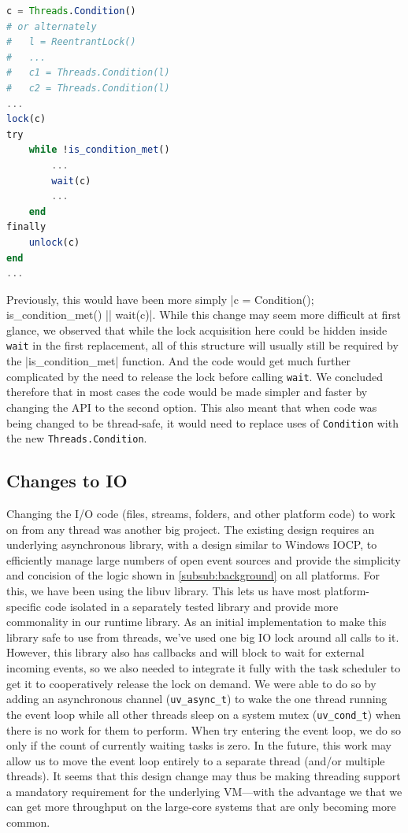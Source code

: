 \documentclass{juliacon}
\begin{document}
\begin{lstlisting}[language = Julia]
c = Threads.Condition()
# or alternately
#   l = ReentrantLock()
#   ...
#   c1 = Threads.Condition(l)
#   c2 = Threads.Condition(l)
...
lock(c)
try
    while !is_condition_met()
        ...
        wait(c)
        ...
    end
finally
    unlock(c)
end
...
\end{lstlisting}

Previously, this would have been more simply |c = Condition(); is_condition_met() || wait(c)|.  While this change may seem more difficult at first glance, we observed that while the lock acquisition here could be hidden inside \verb|wait| in the first replacement, all of this structure will usually still be required by the |is_condition_met| function. And the code would get much further complicated by the need to release the lock before calling \verb|wait|. We concluded therefore that in most cases the code would be made simpler and faster by changing the API to the second option. This also meant that when code was being changed to be thread-safe, it would need to replace uses of \verb|Condition| with the new \verb|Threads.Condition|.

\subsection{Changes to IO}
\label{subsub:integration-io}

Changing the I/O code (files, streams, folders, and other platform code) to work on from any thread was another big project. The existing design requires an underlying asynchronous library, with a design similar to Windows IOCP, to efficiently manage large numbers of open event sources and provide the simplicity and concision of the logic shown in \ref{subsub:background} on all platforms. For this, we have been using the libuv library. This lets us have most platform-specific code isolated in a separately tested library and provide more commonality in our runtime library. As an initial implementation to make this library safe to use from threads, we've used one big IO lock around all calls to it. However, this library also has callbacks and will block to wait for external incoming events, so we also needed to integrate it fully with the task scheduler to get it to cooperatively release the lock on demand. We were able to do so by adding an asynchronous channel (\verb|uv_async_t|) to wake the one thread running the event loop while all other threads sleep on a system mutex (\verb|uv_cond_t|) when there is no work for them to perform. When try entering the event loop, we do so only if the count of currently waiting tasks is zero. In the future, this work may allow us to move the event loop entirely to a separate thread (and/or multiple threads). It seems that this design change may thus be making threading support a mandatory requirement for the underlying VM—with the advantage we that we can get more throughput on the large-core systems that are only becoming more common.
\end{document}
